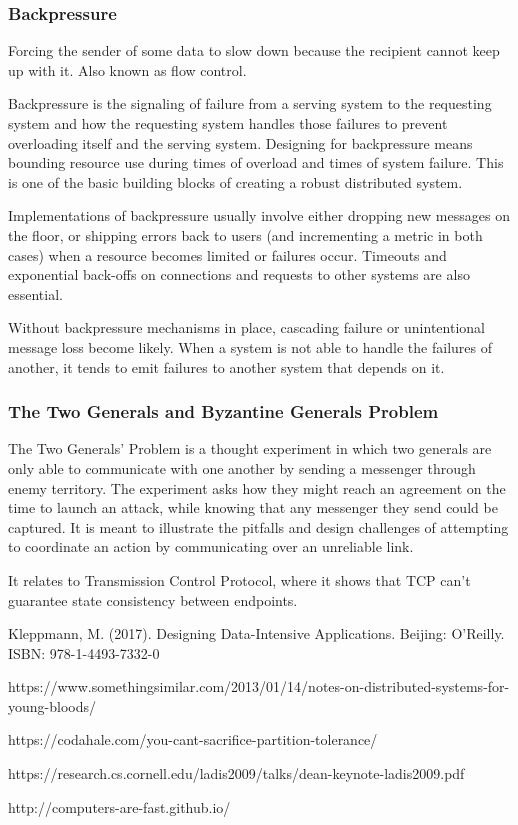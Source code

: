 \documentclass{article}
\begin{document}
    
    \subsubsection{Backpressure}
    Forcing the sender of some data to slow down because the recipient cannot keep up with it. Also known as flow control.
    
    Backpressure is the signaling of failure from a serving system to the requesting system and how the requesting system handles those failures to prevent overloading itself and the serving system. Designing for backpressure means bounding resource use during times of overload and times of system failure. This is one of the basic building blocks of creating a robust distributed system.
    
    Implementations of backpressure usually involve either dropping new messages on the floor, or shipping errors back to users (and incrementing a metric in both cases) when a resource becomes limited or failures occur. Timeouts and exponential back-offs on connections and requests to other systems are also essential.

    Without backpressure mechanisms in place, cascading failure or unintentional message loss become likely. When a system is not able to handle the failures of another, it tends to emit failures to another system that depends on it.
    
    \subsubsection{The Two Generals and Byzantine Generals Problem}
    The Two Generals' Problem is a thought experiment in which two generals are only able to communicate with one another by sending a messenger through enemy territory. The experiment asks how they might reach an agreement on the time to launch an attack, while knowing that any messenger they send could be captured. It is meant to illustrate the pitfalls and design challenges of attempting to coordinate an action by communicating over an unreliable link.
    
    It relates to Transmission Control Protocol, where it shows that TCP can't guarantee state consistency between endpoints.

\begin{thebibliography}{}
Kleppmann, M. (2017). Designing Data-Intensive Applications. Beijing: O'Reilly. ISBN: 978-1-4493-7332-0

https://www.somethingsimilar.com/2013/01/14/notes-on-distributed-systems-for-young-bloods/

https://codahale.com/you-cant-sacrifice-partition-tolerance/

https://research.cs.cornell.edu/ladis2009/talks/dean-keynote-ladis2009.pdf

http://computers-are-fast.github.io/

\end{thebibliography}
\end{document}
